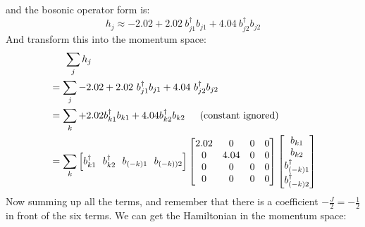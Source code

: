 \documentclass[letter]{article}
\begin{document}
and the bosonic operator form is:$$
h_{j}\approx-2.02+2.02\ b_{j1}^{\dagger}b_{j1}+4.04\ b_{j2}^{\dagger}b_{j2}
$$
And transform this into the momentum space:$$
\begin{aligned}
    &\indent \sum_j  h_j\\
    &=\sum _j -2.02+2.02\ b_{j1}^{\dagger}b_{j1}+4.04\ b_{j2}^{\dagger}b_{j2}\\
    &=\sum_{k}+2.02b_{k1}^{\dagger}b_{k1}+4.04b_{k2}^{\dagger}b_{k2} \indent \text{(constant ignored)}\\
    &=\sum_k \left[
        b_{k1}^{\dagger} \ \ 
        b_{k2}^{\dagger}\  \ 
        b_{(-k)1}\ \ 
        b_{(-k))2}\right]
       \begin{bmatrix}
        2.02 & 0 & 0 & 0 \\
           0 &  4.04 & 0 &0 \\
           0 &  0 & 0 &0\\
            0 & 0 & 0& 0
            \end{bmatrix}\begin{bmatrix}
                b_{k1}  \\
                b_{k2}  \\
                b_{(-k)1}^{\dagger}\\
                b_{(-k)2}^{\dagger}
                \end{bmatrix}
\end{aligned}
$$
Now summing up all the terms, and remember that there is a coefficient $-\frac{J}{2}=-\frac{1}{2}$ in front of the six terms. We can get the Hamiltonian in the momentum space:
\end{document}
